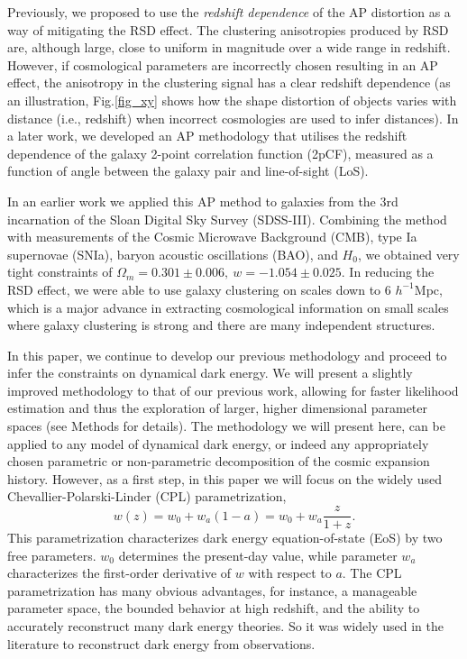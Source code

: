 \documentclass{natureprintstyle}
\let\citep\cite
\begin{document}
Previously, we proposed to use the  {\it redshift dependence} of the AP distortion\cite{Li2014} as a way of mitigating the RSD effect. The clustering anisotropies produced by RSD are, although large, close to uniform in magnitude over a wide range in redshift.  However, if cosmological parameters are incorrectly chosen resulting in an AP effect, 
the anisotropy in the clustering signal has a clear redshift dependence
(as an illustration, Fig.\ref{fig_xy} shows how the shape distortion of objects varies with distance (i.e., redshift) 
when incorrect cosmologies are used to infer distances).
In a later work\cite{Li2015}, we developed an AP methodology 
that utilises the redshift dependence of the galaxy 2-point correlation function (2pCF), 
measured as a function of angle between the galaxy pair and line-of-sight (LoS).


In an earlier work\citep{Li2016} we applied this AP method to galaxies from the 3rd incarnation of the Sloan Digital Sky Survey (SDSS-III). 
Combining the method with measurements of the Cosmic Microwave Background (CMB), type Ia supernovae (SNIa), 
baryon acoustic oscillations (BAO), and $H_0$,
we obtained very tight constraints of $ \Omega_m = 0.301 \pm 0.006,\ w=-1.054 \pm 0.025$.
In reducing the RSD effect, 
we were able to use galaxy clustering on scales down to 6 $h^{-1}$Mpc,
which is a major advance in extracting cosmological information 
on small scales where galaxy clustering is strong and there are many independent structures.

In this paper, we continue to develop our previous methodology and proceed to infer the constraints on dynamical dark energy. 
We will present a slightly improved methodology to that of our previous work\citep{Li2016}, 
allowing for faster likelihood estimation and thus the exploration of larger, higher dimensional parameter spaces
(see Methods for details). 
The methodology we will present here, can be applied to any model of dynamical dark energy, 
or indeed any appropriately chosen parametric or non-parametric decomposition of the cosmic expansion history. 
However, as a first step, in this paper we will focus on the widely used Chevallier-Polarski-Linder (CPL) parametrization\cite{CPL_CP,CPL_L},
\begin{equation}
w(z) = w_0 + w_a (1-a) = w_0 + w_a \frac{z}{1+z}.
\end{equation}
This parametrization characterizes dark energy equation-of-state (EoS) by two free parameters.
$w_0$ determines the present-day value, while parameter $w_a$ characterizes the first-order derivative of $w$ with respect to $a$. 
The CPL parametrization has many obvious advantages, for instance, a manageable parameter space, 
the bounded behavior at high redshift, 
and the ability to accurately reconstruct many dark energy theories\cite{CPL_L}. 
So it was widely used in the literature to reconstruct dark energy from observations.
\end{document}
